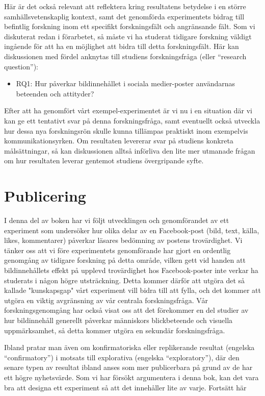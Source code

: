 \documentclass[
]{book}
\providecommand{\tightlist}{%
  \setlength{\itemsep}{0pt}\setlength{\parskip}{0pt}}
\begin{document}
Här är det också relevant att reflektera kring resultatens betydelse i en större samhällsvetenskaplig kontext, samt det genomförda experimentets bidrag till befintlig forskning inom ett specifikt forskningsfält och angränsande fält. Som vi diskuterat redan i förarbetet, så måste vi ha studerat tidigare forskning väldigt ingående för att ha en möjlighet att bidra till detta forskningsfält. Här kan diskussionen med fördel anknytas till studiens forskningsfråga (eller ``research question''):

\begin{itemize}
\tightlist
\item
  RQ1: Hur påverkar bildinnehållet i sociala medier-poster användarnas beteenden och attityder?
\end{itemize}

Efter att ha genomfört vårt exempel-experimentet är vi nu i en situation där vi kan ge ett tentativt svar på denna forskningsfråga, samt eventuellt också utveckla hur dessa nya forskningsrön skulle kunna tillämpas praktiskt inom exempelvis kommunikationsyrken. Om resultaten levererar svar på studiens konkreta målsättningar, så kan diskussionen alltså införliva den lite mer utmanade frågan om hur resultaten leverar gentemot studiens övergripande syfte.

\hypertarget{sec08.3}{%
\section{Publicering}\label{sec08.3}}

I denna del av boken har vi följt utvecklingen och genomförandet av ett experiment som undersöker hur olika delar av en Facebook-post (bild, text, källa, likes, kommentarer) påverkar läsares bedömning av postens trovärdighet. Vi tänker oss att vi före experimentets genomförande har gjort en ordentlig genomgång av tidigare forskning på detta område, vilken gett vid handen att bildinnehållets effekt på upplevd trovärdighet hos Facebook-poster inte verkar ha studerats i någon högre utsträckning. Detta kommer därför att utgöra det så kallade "kunskapsgap" vårt experiment vill bidra till att fylla, och det kommer att utgöra en viktig avgränsning av vår centrala forskningsfråga. Vår forskningsgenomgång har också visat oss att det förekommer en del studier av hur bildinnehåll generellt påverkar människors blickbeteende och visuella uppmärksamhet, så detta kommer utgöra en sekundär forskningsfråga.

Ibland pratar man även om konfirmatoriska eller replikerande resultat (engelska ``confirmatory'') i motsats till explorativa (engelska ``exploratory''), där den senare typen av resultat ibland anses som mer publicerbara på grund av de har ett högre nyhetsvärde. Som vi har försökt argumentera i denna bok, kan det vara bra att designa ett experiment så att det innehåller lite av varje. Fortsätt här
\end{document}
